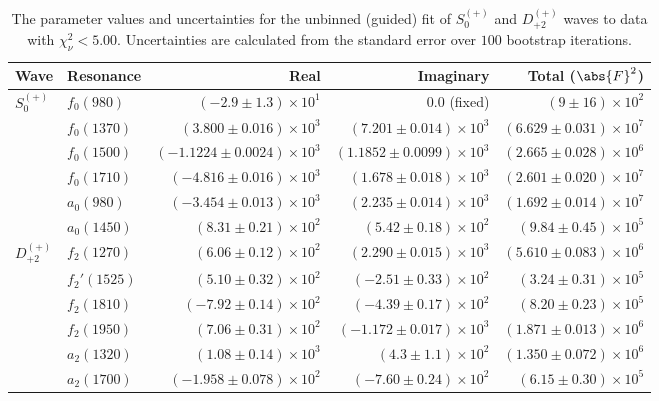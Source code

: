 \begin{table}[ht]
    \begin{center}
        \begin{tabular}{llrrr}\toprule
        Wave & Resonance & Real & Imaginary & Total ($\abs{F}^2$) \\\midrule
$S_{0}^{(+)}$ & $f_{0}(980)$ & $(-2.9 \pm 1.3) \times 10^{1}$ & $0.0$ (fixed) & $(9 \pm 16) \times 10^{2}$ \\
 & $f_{0}(1370)$ & $(3.800 \pm 0.016) \times 10^{3}$ & $(7.201 \pm 0.014) \times 10^{3}$ & $(6.629 \pm 0.031) \times 10^{7}$ \\
 & $f_{0}(1500)$ & $(-1.1224 \pm 0.0024) \times 10^{3}$ & $(1.1852 \pm 0.0099) \times 10^{3}$ & $(2.665 \pm 0.028) \times 10^{6}$ \\
 & $f_{0}(1710)$ & $(-4.816 \pm 0.016) \times 10^{3}$ & $(1.678 \pm 0.018) \times 10^{3}$ & $(2.601 \pm 0.020) \times 10^{7}$ \\
 & $a_{0}(980)$ & $(-3.454 \pm 0.013) \times 10^{3}$ & $(2.235 \pm 0.014) \times 10^{3}$ & $(1.692 \pm 0.014) \times 10^{7}$ \\
 & $a_{0}(1450)$ & $(8.31 \pm 0.21) \times 10^{2}$ & $(5.42 \pm 0.18) \times 10^{2}$ & $(9.84 \pm 0.45) \times 10^{5}$ \\
$D_{+2}^{(+)}$ & $f_{2}(1270)$ & $(6.06 \pm 0.12) \times 10^{2}$ & $(2.290 \pm 0.015) \times 10^{3}$ & $(5.610 \pm 0.083) \times 10^{6}$ \\
 & $f_{2}'(1525)$ & $(5.10 \pm 0.32) \times 10^{2}$ & $(-2.51 \pm 0.33) \times 10^{2}$ & $(3.24 \pm 0.31) \times 10^{5}$ \\
 & $f_{2}(1810)$ & $(-7.92 \pm 0.14) \times 10^{2}$ & $(-4.39 \pm 0.17) \times 10^{2}$ & $(8.20 \pm 0.23) \times 10^{5}$ \\
 & $f_{2}(1950)$ & $(7.06 \pm 0.31) \times 10^{2}$ & $(-1.172 \pm 0.017) \times 10^{3}$ & $(1.871 \pm 0.013) \times 10^{6}$ \\
 & $a_{2}(1320)$ & $(1.08 \pm 0.14) \times 10^{3}$ & $(4.3 \pm 1.1) \times 10^{2}$ & $(1.350 \pm 0.072) \times 10^{6}$ \\
 & $a_{2}(1700)$ & $(-1.958 \pm 0.078) \times 10^{2}$ & $(-7.60 \pm 0.24) \times 10^{2}$ & $(6.15 \pm 0.30) \times 10^{5}$ \\\bottomrule
        \end{tabular}
    \caption{The parameter values and uncertainties for the unbinned (guided) fit of $S_{0}^{(+)}$ and $D_{+2}^{(+)}$ waves to data with $\chi^2_\nu < 5.00$. Uncertainties are calculated from the standard error over $100$ bootstrap iterations.}\label{tab:unbinned-fit-chisqdof-5.0-guided-Sp0p-Dp2p}
    \end{center}
\end{table}
